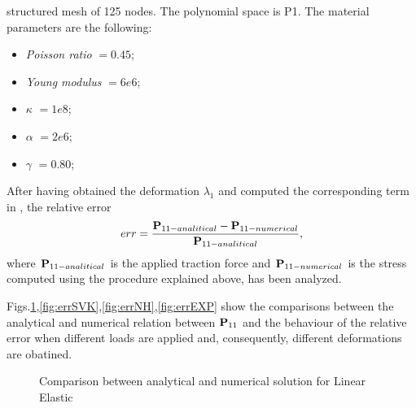 structured mesh of 125 nodes. The polynomial space is P1. The material
parameters are the following:
\begin{itemize}
\item \textit{Poisson ratio} $= 0.45$;
\item \textit{Young modulus} $= 6e6$;
\item $\kappa$ $=1e8$;
\item $\alpha$ $=2e6$;
\item $\gamma$ $=0.80$;
\end{itemize} After having obtained the deformation $\lambda_1$ and
computed the corresponding term in \Piola, the relative error
\begin{equation} err = \displaystyle
  \frac{\textbf{P}_{11-analitical}-\textbf{P}_{11-numerical}}{\textbf{P}_{11-analitical}},
\end{equation} where $\textbf{P}_{11-analitical}$ is the applied traction
force and $\textbf{P}_{11-numerical}$ is the stress computed using the
procedure explained above, has been analyzed.

Figs.\ref{fig:errLE},\ref{fig:errSVK},\ref{fig:errNH},\ref{fig:errEXP}
show the comparisons between the analytical and numerical relation
between $\textbf{P}_{11}$ and the behaviour of the relative error when
different loads are applied and, consequently, different deformations
are obatined.

\begin{figure}[h!]  \centering {}
  \caption{Comparison between analytical and numerical solution for
    Linear Elastic}
  \label{fig:errLE}
\end{figure}

